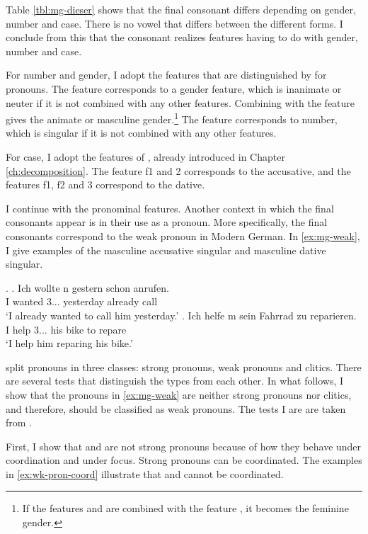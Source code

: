Table \ref{tbl:mg-dieser} shows that the final consonant differs depending on gender, number and case. There is no vowel that differs between the different forms. I conclude from this that the consonant realizes features having to do with gender, number and case.

For number and gender, I adopt the features that are distinguished by \citet{harley2002} for pronouns. The feature  corresponds to a gender feature, which is inanimate or neuter if it is not combined with any other features. Combining  with the feature  gives the animate or masculine gender.\footnote{
If the features  and  are combined with the feature , it becomes the feminine gender.
}
The feature  corresponds to number, which is singular if it is not combined with any other features.

For case, I adopt the features of \citet{caha2009}, already introduced in Chapter \ref{ch:decomposition}. The feature \ac{f}1 and 2 corresponds to the accusative, and the features \ac{f}1, \ac{f}2 and 3 correspond to the dative.

I continue with the pronominal features. Another context in which the final consonants appear is in their use as a pronoun. More specifically, the final consonants correspond to the weak pronoun in Modern German. In \ref{ex:mg-weak}, I give examples of the masculine accusative singular and masculine dative singular.

\ex.\label{ex:mg-weak}
\ag. Ich wollte n gestern schon anrufen.\\
 I wanted 3... yesterday already call\\
 `I already wanted to call him yesterday.'
\bg. Ich helfe m sein Fahrrad zu reparieren.\\
 I help 3... his bike to repare\\
 `I help him reparing his bike.'

\citet{cardinaletti1994} split pronouns in three classes: strong pronouns, weak pronouns and clitics. There are several tests that distinguish the types from each other. In what follows, I show that the pronouns in \ref{ex:mg-weak} are neither strong pronouns nor clitics, and therefore, should be classified as weak pronouns. The tests I are are taken from \citet{cardinaletti1994}.

First, I show that  and  are not strong pronouns because of how they behave under coordination and under focus.
Strong pronouns can be coordinated. The examples in \ref{ex:wk-pron-coord} illustrate that  and  cannot be coordinated.


